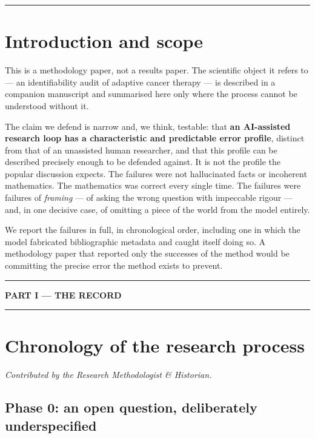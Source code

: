 \documentclass[11pt,a4paper]{article}
\begin{document}
\vspace{1em}
\hrule
\vspace{0.4em}

\section{Introduction and scope}

This is a methodology paper, not a results paper. The scientific object it refers to
--- an identifiability audit of adaptive cancer therapy --- is described in a companion
manuscript \citep{schultz2026audit} and summarised here only where the process cannot
be understood without it.

The claim we defend is narrow and, we think, testable: that \textbf{an AI-assisted
research loop has a characteristic and predictable error profile}, distinct from that
of an unassisted human researcher, and that this profile can be described precisely
enough to be defended against. It is not the profile the popular discussion expects.
The failures were not hallucinated facts or incoherent mathematics. The mathematics was
correct every single time. The failures were failures of \emph{framing} --- of asking
the wrong question with impeccable rigour --- and, in one decisive case, of omitting a
piece of the world from the model entirely.

We report the failures in full, in chronological order, including one in which the model
fabricated bibliographic metadata and caught itself doing so. A methodology paper that
reported only the successes of the method would be committing the precise error the
method exists to prevent.

\vspace{0.5em}
\hrule
\vspace{0.6em}
\begin{center}\large\bfseries PART I --- THE RECORD\end{center}
\vspace{0.2em}
\hrule

\section{Chronology of the research process}
\emph{Contributed by the Research Methodologist \& Historian.}

\subsection{Phase 0: an open question, deliberately underspecified}
\end{document}
